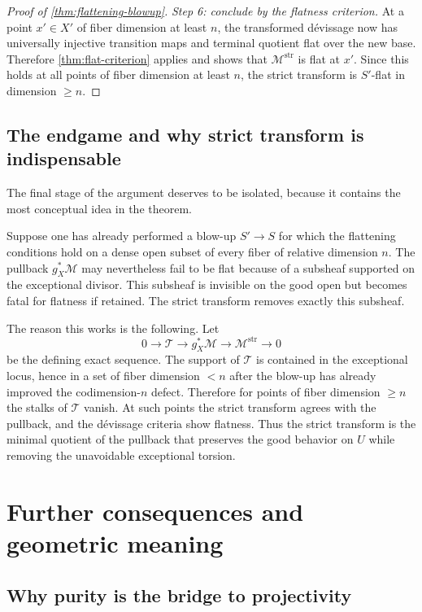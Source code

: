\documentclass[11pt,oneside]{article}
\newcommand{\M}{\mathcal M}
\newcommand{\Tcal}{\mathcal T}
\begin{document}
\begin{proof}[Proof of \cref{thm:flattening-blowup}]
\smallskip
\noindent\emph{Step 6: conclude by the flatness criterion.}
At a point $x'\in X'$ of fiber dimension at least $n$, the transformed d\'evissage now has universally injective transition maps and terminal quotient flat over the new base.  Therefore \cref{thm:flat-criterion} applies and shows that $\M^{\mathrm{str}}$ is flat at $x'$.  Since this holds at all points of fiber dimension at least $n$, the strict transform is $S'$-flat in dimension $\ge n$.
\end{proof}

\subsection{The endgame and why strict transform is indispensable}

The final stage of the argument deserves to be isolated, because it contains the most conceptual idea in the theorem.

Suppose one has already performed a blow-up $S'\to S$ for which the flattening conditions hold on a dense open subset of every fiber of relative dimension $n$.  The pullback $g_X^*\M$ may nevertheless fail to be flat because of a subsheaf supported on the exceptional divisor.  This subsheaf is invisible on the good open but becomes fatal for flatness if retained.  The strict transform removes exactly this subsheaf.

The reason this works is the following.  Let
\[
0\to \Tcal\to g_X^*\M\to \M^{\mathrm{str}}\to 0
\]
be the defining exact sequence.  The support of $\Tcal$ is contained in the exceptional locus, hence in a set of fiber dimension $<n$ after the blow-up has already improved the codimension-$n$ defect.  Therefore for points of fiber dimension $\ge n$ the stalks of $\Tcal$ vanish.  At such points the strict transform agrees with the pullback, and the d\'evissage criteria show flatness.  Thus the strict transform is the minimal quotient of the pullback that preserves the good behavior on $U$ while removing the unavoidable exceptional torsion.

\section{Further consequences and geometric meaning}

\subsection{Why purity is the bridge to projectivity}
\end{document}
